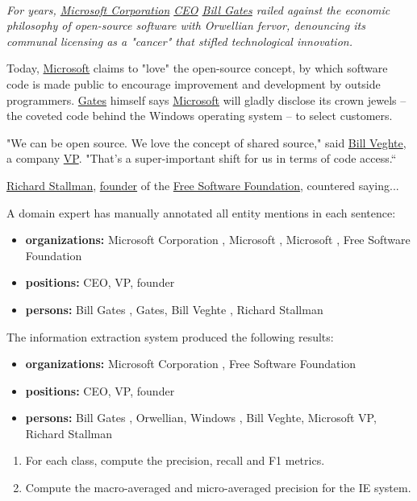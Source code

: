 \documentclass[12pt]{article}
\begin{document}
{\it 
~\\
For years, \underline{Microsoft Corporation} \underline{CEO} \underline{Bill Gates} railed against the economic philosophy of open-source software with Orwellian fervor, denouncing its communal licensing as a "cancer" that stifled technological innovation.

Today, \underline{Microsoft} claims to "love" the open-source concept, by which software code is made public to encourage improvement and development by outside programmers. \underline{Gates} himself says \underline{Microsoft} will gladly disclose its crown jewels -- the coveted code behind the Windows operating system -- to select customers.

"We can be open source. We love the concept of shared source," said \underline{Bill Veghte}, a company \underline{VP}. "That's a super-important shift for us in terms of code access.“

\underline{Richard Stallman}, \underline{founder} of the \underline{Free Software Foundation}, countered saying...
~\\
}

A domain expert has manually annotated all entity mentions in each sentence:

\begin{itemize}
\item {\bf organizations:} Microsoft Corporation , Microsoft , Microsoft , Free Software Foundation
\item {\bf positions:} CEO, VP, founder
\item {\bf persons:} Bill Gates , Gates, Bill Veghte , Richard Stallman
\end{itemize}

The information extraction system produced the following results:

\begin{itemize}
\item {\bf organizations:} Microsoft Corporation , Free Software Foundation
\item {\bf positions:} CEO, VP, founder
\item {\bf persons:} Bill Gates , Orwellian, Windows , Bill Veghte, Microsoft VP, Richard Stallman
\end{itemize}

\begin{enumerate}
\item For each class, compute the precision, recall and F1 metrics.
\item Compute the macro-averaged and micro-averaged precision for the IE system.
\end{enumerate}
\end{document}
